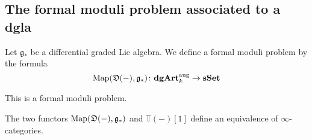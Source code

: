\begin{refsection}
\section{The formal moduli problem associated to a dgla}

Let $\mathfrak g_*$ be a differential graded Lie algebra. We define a formal moduli problem by the formula
\[
\operatorname{\mathrm{Map}}(\mathfrak D(-), \mathfrak g_*) \colon \mathbf{dgArt}_k^{\mathrm{aug}} \to \mathbf{sSet}
\]

\begin{lemma}
This is a formal moduli problem.
\end{lemma}

\begin{thm}
The two functors $\operatorname{\mathrm{Map}}(\mathfrak D(-), \mathfrak g_*)$ and $\mathbb T(-)[1]$ define an equivalence of $\infty$-categories.
\end{thm}

\printbibliography[heading = local]

\end{refsection}
